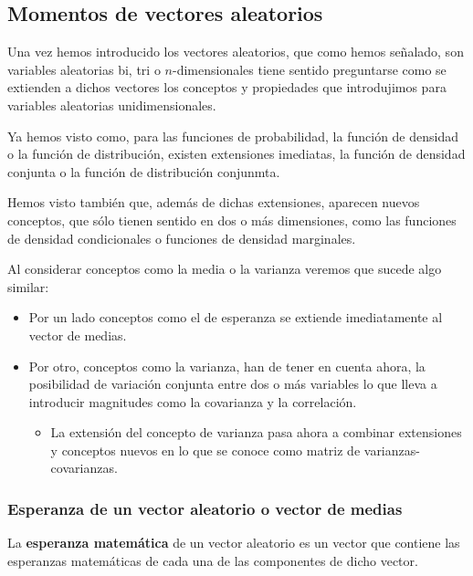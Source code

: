 \documentclass[
]{article}
\providecommand{\tightlist}{%
  \setlength{\itemsep}{0pt}\setlength{\parskip}{0pt}}
\begin{document}
\subsection{Momentos de vectores aleatorios}\label{momentos-de-vectores-aleatorios}

Una vez hemos introducido los vectores aleatorios, que como hemos señalado, son variables aleatorias bi, tri o \(n\)-dimensionales tiene sentido preguntarse como se extienden a dichos vectores los conceptos y propiedades que introdujimos para variables aleatorias unidimensionales.

Ya hemos visto como, para las funciones de probabilidad, la función de densidad o la función de distribución, existen extensiones imediatas, la función de densidad conjunta o la función de distribución conjunmta.

Hemos visto también que, además de dichas extensiones, aparecen nuevos conceptos, que sólo tienen sentido en dos o más dimensiones, como las funciones de densidad condicionales o funciones de densidad marginales.

Al considerar conceptos como la media o la varianza veremos que sucede algo similar:

\begin{itemize}
\tightlist
\item
  Por un lado conceptos como el de esperanza se extiende imediatamente al vector de medias.
\item
  Por otro, conceptos como la varianza, han de tener en cuenta ahora, la posibilidad de variación conjunta entre dos o más variables lo que lleva a introducir magnitudes como la covarianza y la correlación.

  \begin{itemize}
  \tightlist
  \item
    La extensión del concepto de varianza pasa ahora a combinar extensiones y conceptos nuevos en lo que se conoce como matriz de varianzas-covarianzas.
  \end{itemize}
\end{itemize}

\subsubsection{Esperanza de un vector aleatorio o vector de medias}\label{esperanza-de-un-vector-aleatorio-o-vector-de-medias}

La \textbf{esperanza matemática} de un vector aleatorio es un vector que contiene las esperanzas matemáticas de cada una de las componentes de dicho vector.
\end{document}
